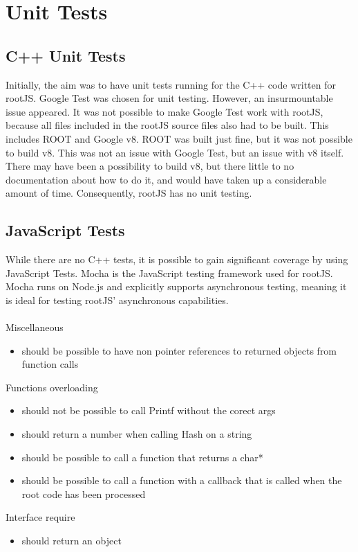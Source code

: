 \chapter{Unit Tests}
\section{C++ Unit Tests}
Initially, the aim was to have unit tests running for the C++ code written for rootJS. 
Google Test was chosen for unit testing. However, an insurmountable issue appeared.
It was not possible to make Google Test work with rootJS, because all files included in
the rootJS source files also had to be built. This includes ROOT and Google v8. ROOT was built just fine, 
but it was not possible to build v8. This was not an issue with Google Test, but an issue with 
v8 itself. There may have been a possibility to build v8, but there little to no documentation 
about how to do it, and would have taken up a considerable amount of time. 
Consequently, rootJS has no unit testing.

\section{JavaScript Tests}
While there are no C++ tests, it is possible to gain significant coverage by using
JavaScript Tests. Mocha is the JavaScript testing framework used for rootJS. 
Mocha runs on Node.js and explicitly supports asynchronous testing, meaning it is ideal for testing 
rootJS' asynchronous capabilities.
\\ \\
Miscellaneous
\begin{itemize}
\item should be possible to have non pointer references to returned objects from function calls
\end{itemize}

Functions overloading
\begin{itemize}
\item should not be possible to call Printf without the corect args
\item should return a number when calling Hash on a string
\item should be possible to call a function that returns a char*
\item should be possible to call a function with a callback that is called when the root code has been processed
\end{itemize}

Interface require
\begin{itemize}
\item should return an object
\end{itemize}

